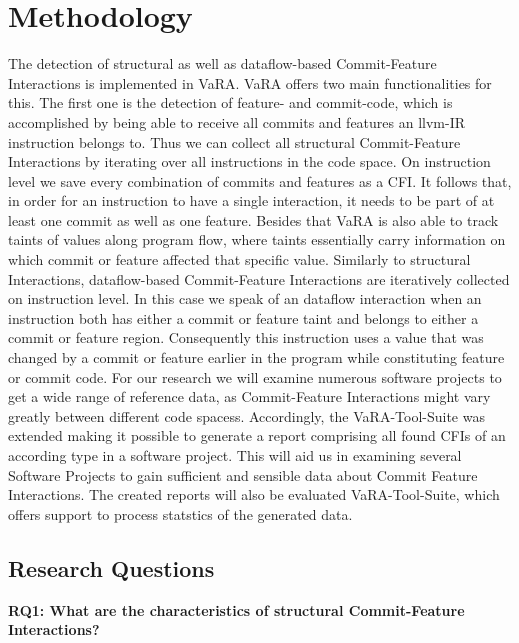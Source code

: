 \section*{Methodology}\label{ch:methodology}

The detection of structural as well as dataflow-based Commit-Feature Interactions is implemented in VaRA.
VaRA offers two main functionalities for this. 
The first one is the detection of feature- and commit-code, which is accomplished by being able to receive all commits and features an llvm-IR instruction belongs to.
Thus we can collect all structural Commit-Feature Interactions by iterating over all instructions in the code space.
On instruction level we save every combination of commits and features as a CFI.
It follows that, in order for an instruction to have a single interaction, it needs to be part of at least one commit as well as one feature.
Besides that VaRA is also able to track taints of values along program flow, where taints essentially carry information on which commit or feature affected that specific value.
Similarly to structural Interactions, dataflow-based Commit-Feature Interactions are iteratively collected on instruction level.
In this case we speak of an dataflow interaction when an instruction both has either a commit or feature taint and belongs to either a commit or feature region.
Consequently this instruction uses a value that was changed by a commit or feature earlier in the program while constituting feature or commit code.
For our research we will examine numerous software projects to get a wide range of reference data, as Commit-Feature Interactions might vary greatly between different code spacess.
Accordingly, the VaRA-Tool-Suite was extended making it possible to generate a report comprising all found CFIs of an according type in a software project.
This will aid us in examining several Software Projects to gain sufficient and sensible data about Commit Feature Interactions.
The created reports will also be evaluated VaRA-Tool-Suite, which offers support to process statstics of the generated data.

\subsection*{Research Questions}\label{sec:research_questions}

\textbf{RQ1: What are the characteristics of structural Commit-Feature Interactions?}

